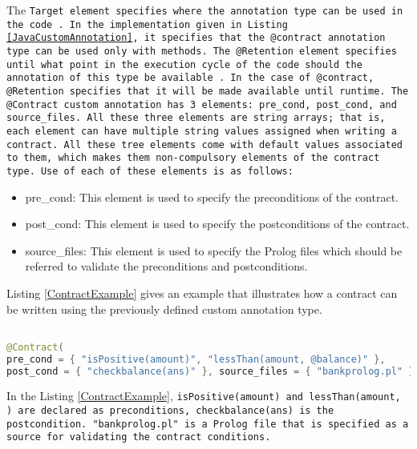 The \tt{Target} element specifies where the annotation type can be used in the code \cite{JavaAnnotationsTutorial}. In the implementation given in Listing \ref{JavaCustomAnnotation}, it specifies that the \tt{@contract} annotation type can be used only with methods. 
The \tt{@Retention} element specifies until what point in the execution cycle of the code should the annotation of this type be available \cite{JavaAnnotationsTutorial}. In the case of \tt{@contract}, \tt{@Retention} specifies that it will be made available until runtime.   
The \tt{@Contract} custom annotation has 3 elements: pre\_cond, post\_cond, and source\_files. All these three elements are string arrays; that is, each element can have multiple string values assigned when writing a contract. All these tree elements come with default values associated to them, which makes them non-compulsory elements of the contract type. Use of each of these elements is as follows:
\begin{itemize}
\item pre\_cond: This element is used to specify the preconditions of the contract.
\item post\_cond: This element is used to specify the postconditions of the contract.
\item source\_files: This element is used to specify the Prolog files which should be referred to validate the preconditions and postconditions.
\end{itemize} 

Listing \ref{ContractExample} gives an example that illustrates how a contract can be written using the previously defined  custom annotation type.
\linebreak


\begin{minipage}{\linewidth}     
\begin{lstlisting}[frame=single, language=Java, caption={using custom annotation to write contract}, label={ContractExample}, captionpos=b, breaklines=true, showstringspaces=false]

@Contract(
pre_cond = { "isPositive(amount)", "lessThan(amount, @balance)" }, 
post_cond = { "checkbalance(ans)" }, source_files = { "bankprolog.pl" })

\end{lstlisting}
\end{minipage}

In the Listing \ref{ContractExample}, \tt{isPositive(amount)} and \tt{lessThan(amount, \@balance)} are declared as preconditions, \tt{checkbalance(ans)} is the postcondition. "bankprolog.pl" is a Prolog file that is specified as a source for validating the contract conditions.

